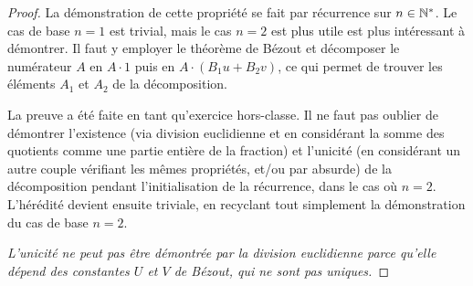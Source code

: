 \documentclass[12pt, a4paper]{report}
\begin{document}
\begin{proof}
    La démonstration de cette propriété se fait par récurrence sur $n \in \mathbb{N}^*$. Le cas de base $n=1$ est trivial, mais le cas $n=2$ est plus utile est plus intéressant à démontrer. Il faut y employer le théorème de Bézout et décomposer le numérateur $A$ en $A\cdot 1$ puis en $A\cdot (B_1 u + B_2 v)$, ce qui permet de trouver les éléments $A_1$ et $A_2$ de la décomposition.

    La preuve a été faite en tant qu'exercice hors-classe. Il ne faut pas oublier de démontrer l'existence (via division euclidienne et en considérant la somme des quotients comme une partie entière de la fraction) et l'unicité (en considérant un autre couple vérifiant les mêmes propriétés, et/ou par absurde) de la décomposition pendant l'initialisation de la récurrence, dans le cas où $n=2$. L'hérédité devient ensuite triviale, en recyclant tout simplement la démonstration du cas de base $n=2$.

    \textit{L'unicité ne peut pas être démontrée par la division euclidienne parce qu'elle dépend des constantes $U$ et $V$ de Bézout, qui ne sont pas uniques.}


\end{proof}
\end{document}
